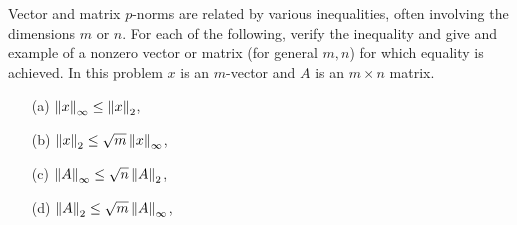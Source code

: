 \documentclass[10pt]{article}
\begin{document}
\begin{problem}[Exercise 3.3]
Vector and matrix \( p \)-norms are related by various inequalities, often involving the dimensions \( m \) or \( n \). For each of the following, verify the inequality and give and example of a nonzero vector or matrix (for general \( m,n \)) for which equality is achieved. In this problem \( x \) is an \( m \)-vector and \( A \) is an \( m\times n \) matrix.
\begin{enumerate}
	\item[(a)] \( \left\lVert x\right\rVert_\infty\leq\left\lVert x\right\rVert_2 \),
	\item[(b)] \( \left\lVert x\right\rVert_2\leq\sqrt{m}\left\lVert x\right\rVert_\infty \),
	\item[(c)] \( \left\lVert A\right\rVert_\infty\leq\sqrt{n}\left\lVert A\right\rVert_2 \),
	\item[(d)] \( \left\lVert A\right\rVert_2\leq\sqrt{m}\left\lVert A\right\rVert_\infty \),
\end{enumerate}
\end{problem}
\end{document}

